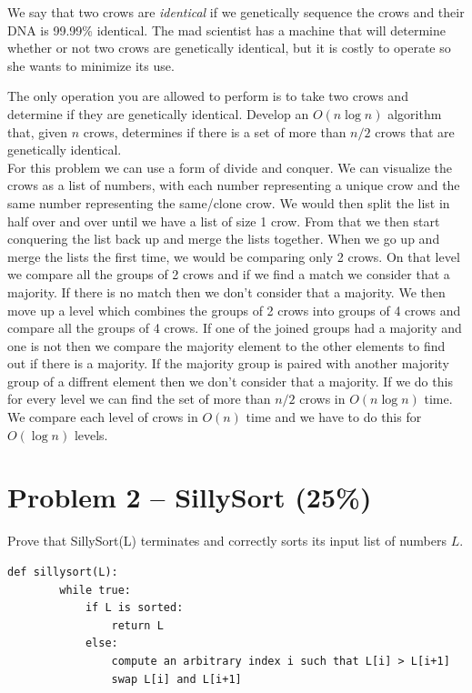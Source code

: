 \documentclass[12pt,letterpaper]{article}
\begin{document}
We say that two crows are \textit{identical} if we genetically sequence the crows and their DNA is 99.99\% identical.
The mad scientist has a machine that will determine whether or not two crows are genetically identical, but it is costly to operate so she wants to minimize its use.

The only operation you are allowed to perform is to take two crows and determine if they are genetically identical.
Develop an $O(n \log n)$ algorithm that, given $n$ crows, determines if there is a set of more than $n/2$ crows that are genetically identical.
\\[14pt]
For this problem we can use a form of divide and conquer. 
We can visualize the crows as a list of numbers, with 
each number representing a unique crow and the same number representing the same/clone crow.
We would then split the list in half over and over until we have a list of size 1 crow.
From that we then start conquering the list back up and merge the lists together.
When we go up and merge the lists the first time, we would be comparing only 2 crows.
On that level we compare all the groups of 2 crows and if we find a match we consider that a majority.
If there is no match then we don't consider that a majority. We then move up a level
which combines the groups of 2 crows into groups of 4 crows and compare all the groups of 4 crows.
If one of the joined groups had a majority and one is not then we compare the majority element to the other elements to find out if there is a majority.
If the majority group is paired with another majority group of a diffrent element then we don't consider that a majority.
If we do this for every level we can find the set of more than $n/2$ crows in $O(n \log n)$ time.
We compare each level of crows in $O(n)$ time and we have to do this for $O(\log n)$ levels.


\newpage

\section*{Problem 2 -- SillySort (25\%)}

Prove that SillySort(L) terminates and correctly sorts its input list of numbers $L$.

     \begin{lstlisting}[style = Python]
    def sillysort(L):
        while true:
            if L is sorted:
                return L
            else:
                compute an arbitrary index i such that L[i] > L[i+1]
                swap L[i] and L[i+1]
    \end{lstlisting}
\end{document}
